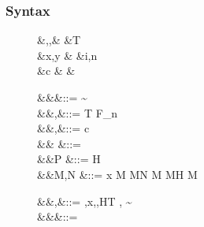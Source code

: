 \documentclass[manuscript,screen,nonacm]{acmart}
\begin{document}



\subsubsection{Syntax}
\begin{figure}[ht]
  \centering
  \begin{syntax}
     &\alpha,\beta,\gamma  &\qquad{} &T \\
     &x,y                  &\qquad{}        &i,n \in {} \\
     &c & &
  \end{syntax}
  \begin{syntax}
         &&\kappa       &::= \star \mid \kappa \to \kappa \mid \sigma \sim \tau\\
         &&\tau,\sigma  &::= \alpha \mid T \mid \tau \to \tau \mid \tau\App\tau \mid \Forall {\alpha\co\kappa} \tau \mid F_n\\
     &&\nu,\Co      &::= c \mid {}\tau \mid \sym\Co \mid \trans\nu\Co %
                                        \mid \Forall {\alpha\co\kappa} \Co \mid \Co\At\tau %
                                        \mid \nu\App\Co \mid \Left \Co \mid \Right \Co\\  %
     && \phi &::= \tau \mid \Co\\
      &&P    &::= H\App \many{\alpha\co\kappa} \\
         &&M,N  &::= x \mid  {} M \mid M\App N \mid \TLam{\tau\co\kappa} M \mid M\App \tau \mid H \mid \Case M  \mid \Cast \Tm \Co\\

    \end{syntax}
    \begin{syntax}
     &&\TEnv,\Delta &::= \empt \mid \TEnv,x\co\tau \mid \TEnv,\alpha\co\kappa \mid \TEnv,H\co T \mid \TEnv, \gamma \co \tau\sim\sigma\\
      &&\Subst       &::= \empt \mid \Set{\many{\alpha \mapsto \tau}}
  \end{syntax}


\end{figure}
\end{document}
